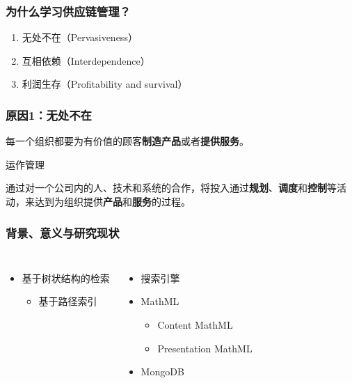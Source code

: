 \documentclass{beamer}
\begin{document}
\begin{frame}
\frametitle{为什么学习供应链管理？}

\begin{enumerate}
\item 无处不在（Pervasiveness）
\item 互相依赖（Interdependence）
\item 利润生存（Profitability and survival）
\end{enumerate}

\end{frame}


\begin{frame}
\frametitle{原因1：无处不在}

每一个组织都要为有价值的顾客\textbf{制造产品}或者\textbf{提供服务}。

\begin{block}{运作管理}

通过对一个公司内的人、技术和系统的合作，将投入通过\textbf{规划}、\textbf{调度}和\textbf{控制}等活动，来达到为组织提供\textbf{产品}和\textbf{服务}的过程。

\end{block}

\end{frame}


\begin{frame}
    \frametitle{背景、意义与研究现状}
    \begin{columns}
        \pause

        \begin{itemize}
            \item 基于树状结构的检索
            \begin{itemize}
                \item 基于路径索引
            \end{itemize}
        \end{itemize}

        \pause

        \begin{itemize}
            \item<2-> 搜索引擎
            \item<4-> MathML
              \begin{itemize}
                \item<4-> Content MathML
                \item<4-> Presentation MathML
              \end{itemize}
            \item<3-> MongoDB
        \end{itemize}

    \end{columns}
\end{frame}
\end{document}
